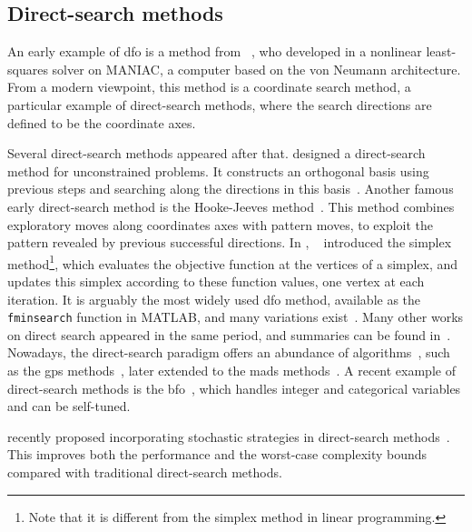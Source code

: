 \subsection{Direct-search methods}

An early example of \gls{dfo} is a method from \citeauthor{Fermi_Metropolis_1952}~\cite{Fermi_Metropolis_1952}, who developed in \citeyear{Fermi_Metropolis_1952} a nonlinear least-squares solver on MANIAC, a computer based on the von Neumann architecture.
From a modern viewpoint, this method is a coordinate search method, a particular example of direct-search methods, where the search directions are defined to be the coordinate axes.

Several direct-search methods appeared after that.
\citeauthor{Rosenbrock_1960} designed a direct-search method for unconstrained problems.
It constructs an orthogonal basis using previous steps and searching along the directions in this basis~\cite{Rosenbrock_1960}.
Another famous early direct-search method is the Hooke-Jeeves method~\cite{Hooke_Jeeves_1961}.
This method combines exploratory moves along coordinates axes with pattern moves, to exploit the pattern revealed by previous successful directions.
In \citeyear{Nelder_Mead_1965}, \citeauthor{Nelder_Mead_1965}~\cite{Nelder_Mead_1965} introduced the simplex method\footnote{Note that it is different from the simplex method in linear programming.}, which evaluates the objective function at the vertices of a simplex, and updates this simplex according to these function values, one vertex at each iteration.
It is arguably the most widely used \gls{dfo} method, available as the \verb|fminsearch| function in MATLAB, and many variations exist~\cite{Wright_2012}.
Many other works on direct search appeared in the same period, and summaries can be found in~\cite{Fletcher_1965,Box_1966}.
Nowadays, the direct-search paradigm offers an abundance of algorithms~\cite{Kolda_Lewis_Torczon_2003}, such as the \gls{gps} methods~\cite{Booker_Etal_1999}, later extended to the \gls{mads} methods~\cite{Audet_Dennis_2006,Abramson_Audet_2006,Abramson_Etal_2009,Audet_Dennis_Digabel_2008,Digabel_2011}.
A recent example of direct-search methods is the \gls{bfo}~\cite{Porcelli_Toint_2017,Porcelli_Toint_2022}, which handles integer and categorical variables and can be self-tuned.

 recently proposed incorporating stochastic strategies in direct-search methods~\cite{Gratton_Etal_2015,Gratton_Etal_2019}.
This improves both the performance and the worst-case complexity bounds compared with traditional direct-search methods.

